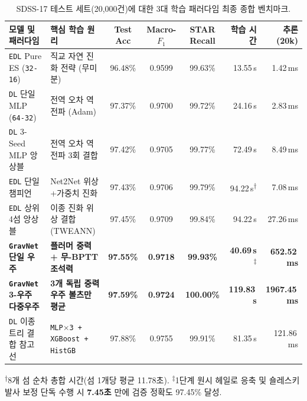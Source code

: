 \documentclass[11pt,a4paper]{article}
\begin{document}
\begin{table}[H]
\centering
\caption{SDSS-17 테스트 세트(20,000건)에 대한 3대 학습 패러다임 최종 종합 벤치마크.}
\label{tab:benchmark_all}
\footnotesize
\setlength{\tabcolsep}{4.0pt}
\begin{tabularx}{\textwidth}{>{\raggedright\arraybackslash}X l c c c r r}
\toprule
\textbf{모델 및 패러다임} & \textbf{핵심 학습 원리} & \textbf{Test Acc} & \textbf{Macro-$F_1$} & \textbf{STAR Recall} & \textbf{학습 시간} & \textbf{추론(20k)} \\
\midrule
\texttt{EDL} Pure ES (\texttt{32-16}) & 직교 자연 진화 전략 (무미분) & 96.48\% & 0.9599 & 99.63\% & 13.55\,s & 1.42\,ms \\
\texttt{DL} 단일 MLP (\texttt{64-32}) & 전역 오차 역전파 (Adam) & 97.37\% & 0.9700 & 99.72\% & 24.16\,s & 2.83\,ms \\
\texttt{DL} 3-Seed MLP 앙상블 & 전역 오차 역전파 3회 결합 & 97.42\% & 0.9705 & 99.77\% & 72.49\,s & 8.49\,ms \\
\texttt{EDL} 단일 챔피언 & Net2Net 위상+가중치 진화 & 97.43\% & 0.9706 & 99.79\% & 94.22\,s\textsuperscript{$\dagger$} & 7.08\,ms \\
\texttt{EDL} 상위 4섬 앙상블 & 이종 진화 위상 결합 (TWEANN) & 97.45\% & 0.9709 & 99.84\% & 94.22\,s & 27.26\,ms \\
\midrule
\textbf{\texttt{GravNet} 단일 우주} & \textbf{플러머 중력 + 무-BPTT 조석력} & \textbf{97.55\%} & \textbf{0.9718} & \textbf{99.93\%} & \textbf{40.69\,s}\textsuperscript{$\ddagger$} & \textbf{652.52\,ms} \\
\textbf{\texttt{GravNet} 3-우주 다중우주} & \textbf{3개 독립 중력 우주 볼츠만 평균} & \textbf{97.59\%} & \textbf{0.9724} & \textbf{100.00\%} & \textbf{119.83\,s} & \textbf{1967.45\,ms} \\
\midrule
{\color{MutedText}\texttt{DL} 이종 트리 결합 참고선} & {\color{MutedText}\texttt{MLP$\times$3 + XGBoost + HistGB}} & {\color{MutedText}97.88\%} & {\color{MutedText}0.9755} & {\color{MutedText}99.91\%} & {\color{MutedText}81.35\,s} & {\color{MutedText}121.86\,ms} \\
\bottomrule
\end{tabularx}
\vspace{2pt}
\par{\scriptsize \textsuperscript{$\dagger$}8개 섬 순차 총합 시간(섬 1개당 평균 11.78초). \quad \textsuperscript{$\ddagger$}1단계 원시 헤일로 응축 및 숄레스키 발사 보정 단독 수행 시 \textbf{7.45초} 만에 검증 정확도 97.45\% 달성.}
\end{table}
\end{document}
